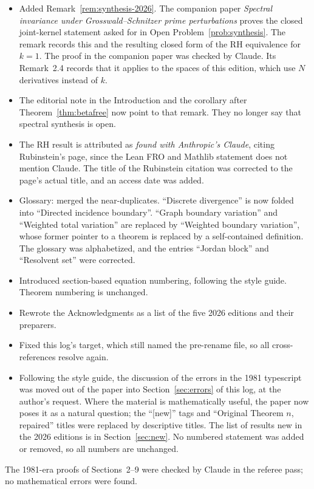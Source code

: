\documentclass[12pt,letterpaper]{article}
\begin{document}
\begin{itemize}
\item Added Remark~\ref{rem:synthesis-2026}.  The companion paper
  \emph{Spectral invariance under Grosswald--Schnitzer prime
  perturbations} proves the closed joint-kernel statement asked for in
  Open Problem~\ref{prob:synthesis}.  The remark records this and the
  resulting closed form of the RH equivalence for $k=1$.  The proof in
  the companion paper was checked by Claude.  Its Remark~2.4 records
  that it applies to the spaces of this edition, which use $N$
  derivatives instead of $k$.
\item The editorial note in the Introduction and the corollary after
  Theorem~\ref{thm:betafree} now point to that remark.  They no longer
  say that spectral synthesis is open.
\item The RH result is attributed as \emph{found with Anthropic's
  Claude}, citing Rubinstein's page, since the Lean FRO and Mathlib
  statement does not mention Claude.  The title of the Rubinstein
  citation was corrected to the page's actual title, and an access date
  was added.
\item Glossary: merged the near-duplicates.  ``Discrete divergence'' is
  now folded into ``Directed incidence boundary''.  ``Graph boundary
  variation'' and ``Weighted total variation'' are replaced by
  ``Weighted boundary variation'', whose former pointer to a theorem is
  replaced by a self-contained definition.  The glossary was
  alphabetized, and the entries ``Jordan block'' and ``Resolvent set''
  were corrected.
\item Introduced section-based equation numbering, following the
  style guide.  Theorem numbering is unchanged.
\item Rewrote the Acknowledgments as a list of the five 2026 editions
  and their preparers.
\item Fixed this log's \verb|| target, which still named
  the pre-rename file, so all cross-references resolve again.
\item Following the style guide, the discussion of the errors in the 1981
  typescript was moved out of the paper into
  Section~\ref{sec:errors} of this log, at the author's request.  Where
  the material is mathematically useful, the paper now poses it as a
  natural question; the ``[new]'' tags and ``Original Theorem $n$,
  repaired'' titles were replaced by descriptive titles.  The list of
  results new in the 2026 editions is in Section~\ref{sec:new}.  No
  numbered statement was added or removed, so all numbers are unchanged.
\end{itemize}
The 1981-era proofs of Sections~2--9 were checked by Claude in the
referee pass; no mathematical errors were found.
\end{document}
